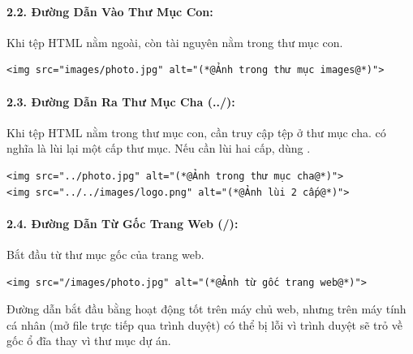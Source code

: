 \paragraph{2.2. Đường Dẫn Vào Thư Mục Con:}
Khi tệp HTML nằm ngoài, còn tài nguyên nằm trong thư mục con.

\begin{codeWindow}
\begin{lstlisting}[language=HTML5]
<img src="images/photo.jpg" alt="(*@Ảnh trong thư mục images@*)">
\end{lstlisting}
\end{codeWindow}

\paragraph{2.3. Đường Dẫn Ra Thư Mục Cha (../):}
Khi tệp HTML nằm trong thư mục con, cần truy cập tệp ở thư mục cha.  có nghĩa là lùi lại một cấp thư mục. Nếu cần lùi hai cấp, dùng .

\begin{codeWindow}
\begin{lstlisting}[language=HTML5]
<img src="../photo.jpg" alt="(*@Ảnh trong thư mục cha@*)">
<img src="../../images/logo.png" alt="(*@Ảnh lùi 2 cấp@*)">
\end{lstlisting}
\end{codeWindow}

\paragraph{2.4. Đường Dẫn Từ Gốc Trang Web (/):}
Bắt đầu từ thư mục gốc của trang web.

\begin{codeWindow}
\begin{lstlisting}[language=HTML5]
<img src="/images/photo.jpg" alt="(*@Ảnh từ gốc trang web@*)">
\end{lstlisting}
\end{codeWindow}

\begin{noteBox}
Đường dẫn bắt đầu bằng \codeinline{/} hoạt động tốt trên máy chủ web, nhưng trên máy tính cá nhân (mở file trực tiếp qua trình duyệt) có thể bị lỗi vì trình duyệt sẽ trỏ về gốc ổ đĩa thay vì thư mục dự án.
\end{noteBox}

